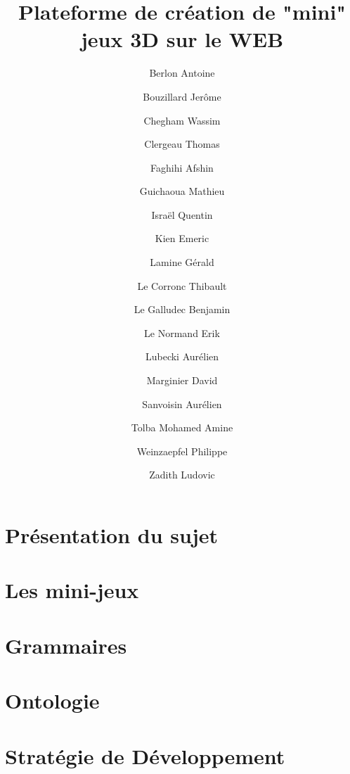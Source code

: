 \documentclass[a4paper,10pt]{article}
\title{Plateforme de création de "mini" jeux 3D sur le WEB}
\author{Berlon Antoine \and
Bouzillard Jerôme \and
Chegham	Wassim \and
Clergeau Thomas \and
Faghihi	Afshin \and
Guichaoua Mathieu \and
Israël Quentin \and
Kien Emeric \and
Lamine Gérald \and
Le Corronc Thibault \and
Le Galludec Benjamin \and
Le Normand Erik \and
Lubecki Aurélien \and
Marginier David \and
Sanvoisin Aurélien \and
Tolba Mohamed Amine \and
Weinzaepfel Philippe \and
Zadith	Ludovic}
\date{}
\begin{document}
 
\maketitle

\section{Présentation du sujet}
\label{sec:sujet}
 

\section{Les mini-jeux}
\label{sec:minijeux}


\section{Grammaires}
\label{sec:grammaire}


\section{Ontologie}
\label{sec:ontologie}


\section{Stratégie de Développement}
\label{sec:strategie}

\end{document}
